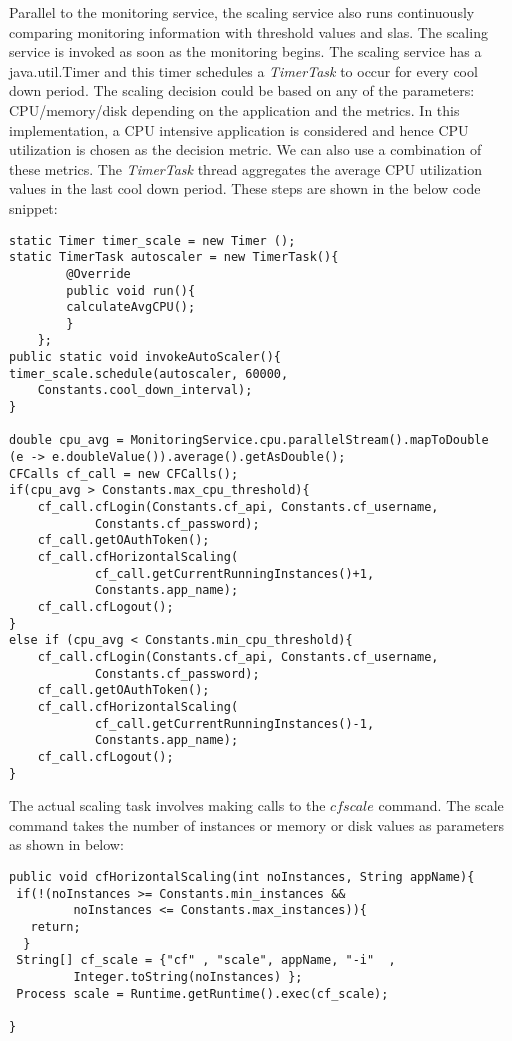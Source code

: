 \documentclass[article,type=msc,colorback,12pt,accentcolor=tud8b,table]{tudthesis}
\begin{document}
	Parallel to the monitoring service, the scaling service also runs continuously comparing monitoring information with threshold values and \gls{sla}s. The scaling service is invoked as soon as the monitoring begins. The scaling service has a java.util.Timer and this timer schedules a \textit{TimerTask} to occur for every cool down period. The scaling decision could be based on any of the parameters: CPU/memory/disk depending on the application and the metrics. In this implementation, a CPU intensive application is considered and hence CPU utilization is chosen as the decision metric. We can also use a combination of these metrics. The \textit{TimerTask} thread aggregates the average CPU utilization values in the last cool down period. These steps are shown in the below code snippet:
\begin{lstlisting}
static Timer timer_scale = new Timer ();
static TimerTask autoscaler = new TimerTask(){
	 	@Override
	 	public void run(){
	 	calculateAvgCPU();
	 	}
 	};
public static void invokeAutoScaler(){
timer_scale.schedule(autoscaler, 60000, 
	Constants.cool_down_interval);
}

double cpu_avg = MonitoringService.cpu.parallelStream().mapToDouble
(e -> e.doubleValue()).average().getAsDouble();
CFCalls cf_call = new CFCalls();
if(cpu_avg > Constants.max_cpu_threshold){
	cf_call.cfLogin(Constants.cf_api, Constants.cf_username, 
			Constants.cf_password);
	cf_call.getOAuthToken();
	cf_call.cfHorizontalScaling(
			cf_call.getCurrentRunningInstances()+1, 
			Constants.app_name);
	cf_call.cfLogout();
}
else if (cpu_avg < Constants.min_cpu_threshold){
	cf_call.cfLogin(Constants.cf_api, Constants.cf_username, 
			Constants.cf_password);
	cf_call.getOAuthToken();
	cf_call.cfHorizontalScaling(
			cf_call.getCurrentRunningInstances()-1, 
			Constants.app_name);
	cf_call.cfLogout();
}
\end{lstlisting}
	The actual scaling task involves making calls to the $cf scale$ command. The scale command takes the number of instances or memory or disk values as parameters as shown in below:
	\begin{lstlisting}
public void cfHorizontalScaling(int noInstances, String appName){
 if(!(noInstances >= Constants.min_instances && 
		 noInstances <= Constants.max_instances)){
   return;
  }
 String[] cf_scale = {"cf" , "scale", appName, "-i"  , 
		 Integer.toString(noInstances) };
 Process scale = Runtime.getRuntime().exec(cf_scale);

}	
	\end{lstlisting}
	
\end{document}
